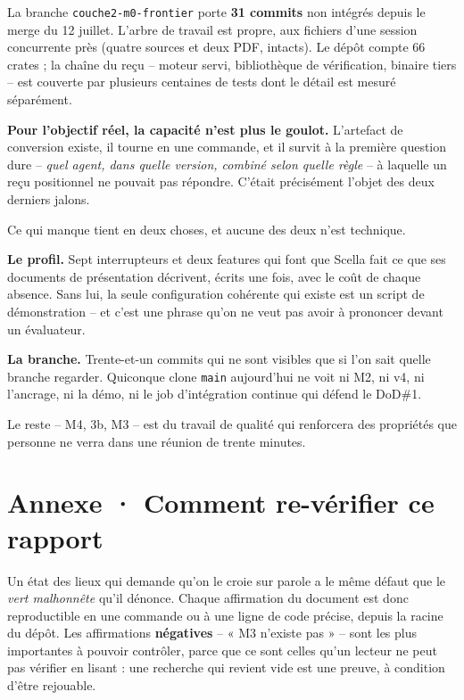 \documentclass[10pt]{article}
\newcommand{\code}[1]{\texttt{\small #1}}
\begin{document}
La branche \code{couche2-m0-frontier} porte \textbf{31 commits} non intégrés depuis le merge du
12 juillet. L'arbre de travail est propre, aux fichiers d'une session concurrente près (quatre sources
et deux PDF, intacts). Le dépôt compte 66 crates ; la chaîne du reçu -- moteur servi, bibliothèque de
vérification, binaire tiers -- est couverte par plusieurs centaines de tests dont le détail est mesuré
séparément.

\begin{acquis}
\textbf{Pour l'objectif réel, la capacité n'est plus le goulot.} L'artefact de conversion existe, il
tourne en une commande, et il survit à la première question dure -- \emph{quel agent, dans quelle
version, combiné selon quelle règle} -- à laquelle un reçu positionnel ne pouvait pas répondre. C'était
précisément l'objet des deux derniers jalons.
\end{acquis}

Ce qui manque tient en deux choses, et aucune des deux n'est technique.

\textbf{Le profil.} Sept interrupteurs et deux features qui font que Scella fait ce que ses documents
de présentation décrivent, écrits une fois, avec le coût de chaque absence. Sans lui, la seule
configuration cohérente qui existe est un script de démonstration -- et c'est une phrase qu'on ne veut
pas avoir à prononcer devant un évaluateur.

\textbf{La branche.} Trente-et-un commits qui ne sont visibles que si l'on sait quelle branche
regarder. Quiconque clone \code{main} aujourd'hui ne voit ni M2, ni v4, ni l'ancrage, ni la démo, ni le
job d'intégration continue qui défend le DoD\#1.

Le reste -- M4, 3b, M3 -- est du travail de qualité qui renforcera des propriétés que personne ne verra
dans une réunion de trente minutes.

\section{Annexe · Comment re-vérifier ce rapport}

Un état des lieux qui demande qu'on le croie sur parole a le même défaut que le \emph{vert malhonnête}
qu'il dénonce. Chaque affirmation du document est donc reproductible en une commande ou à une ligne de
code précise, depuis la racine du dépôt. Les affirmations \textbf{négatives} -- « M3 n'existe pas » --
sont les plus importantes à pouvoir contrôler, parce que ce sont celles qu'un lecteur ne peut pas
vérifier en lisant : une recherche qui revient vide est une preuve, à condition d'être rejouable.
\end{document}
